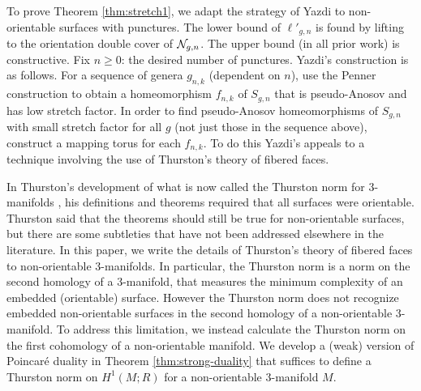

 To prove Theorem \ref{thm:stretch1}, we adapt the strategy of Yazdi \cite{yazdi2018pseudo} to non-orientable surfaces with punctures.  The lower bound of $\ell'_{g,n}$ is found by lifting to the orientation double cover of $\mathcal{N}_{g,n}$.  The upper bound (in all prior work) is constructive.  Fix $n\geq 0$: the desired number of punctures.  Yazdi's construction is as follows.  For a sequence of genera $g_{n,k}$ (dependent on $n$), use the Penner construction \cite{penner1988construction} to obtain a homeomorphism $f_{n,k}$ of $S_{g,n}$ that is pseudo-Anosov and has low stretch factor.  In order to find pseudo-Anosov homeomorphisms of $S_{g,n}$ with small stretch factor for all $g$ (not just those in the sequence above), construct a mapping torus for each $f_{n,k}$.  To do this Yazdi's appeals to a technique involving the use of Thurston's theory of fibered faces.  %

 In Thurston's development of what is now called the Thurston norm for 3-manifolds \cite{thurston1986norm}, his definitions and theorems required that all surfaces were orientable.  Thurston said that the theorems should still be true for non-orientable surfaces, but there are some subtleties that have not been addressed elsewhere in the literature.  In this paper, we write the details of Thurston's theory of fibered faces to non-orientable 3-manifolds.  In particular, the Thurston norm is a norm on the second homology of a 3-manifold, that measures the minimum complexity of an embedded (orientable) surface. However the Thurston norm does not recognize embedded non-orientable surfaces in the second homology of a non-orientable 3-manifold.  To address this limitation, we instead calculate the Thurston norm on the first cohomology of a non-orientable manifold.  We develop a (weak) version of Poincar\'e duality in Theorem \ref{thm:strong-duality} that suffices to define a Thurston norm on $H^1(M;R)$ for a non-orientable 3-manifold $M$.


